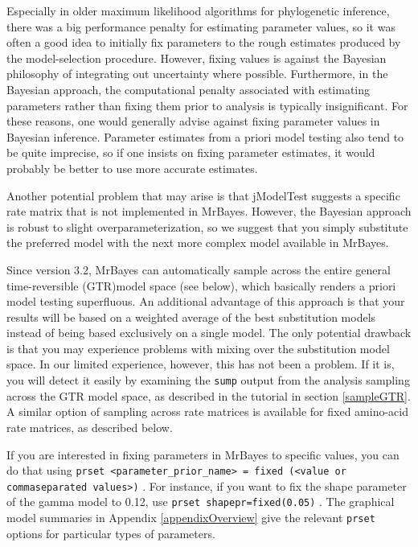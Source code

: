 \documentclass[12pt]{book}
\newcommand{\ttt}[1]{\texttt{#1} }
\begin{document}
Especially in older maximum likelihood algorithms for phylogenetic inference, there was a big
performance penalty for estimating parameter values, so it was often a good idea to initially fix
parameters to the rough estimates produced by the model-selection procedure. However, fixing values
is against the Bayesian philosophy of integrating out uncertainty where possible. Furthermore, in the Bayesian approach, the computational penalty associated with estimating parameters rather than fixing them prior
to analysis is typically insignificant. For these reasons, one would generally advise against fixing parameter
values in Bayesian inference. Parameter estimates from a priori model testing also tend to be quite imprecise,
so if one insists on fixing parameter estimates, it would probably be better to use more accurate estimates.

Another potential problem that may arise is that jModelTest suggests a specific rate matrix that
is not implemented in MrBayes. However, the Bayesian approach is robust to slight
overparameterization, so we suggest that you simply substitute the preferred model with the
next more complex model available in MrBayes.

Since version 3.2, MrBayes can automatically sample across the entire general time-reversible (GTR)model
space (see below), which basically renders a priori model testing superfluous. An additional
advantage of this approach is that your results will be based on a weighted average of the
best substitution models instead of being based exclusively on a single model. The only potential
drawback is that you may experience problems with mixing over the substitution model space.
In our limited experience, however, this has not been a problem. If it is, you will detect it
easily by examining the \ttt{sump} output from the analysis sampling across the GTR model space,
as described in the tutorial in section \ref{sampleGTR}.
A similar option of sampling across rate matrices is available for fixed amino-acid rate matrices,
as described below.

If you are interested in fixing parameters in MrBayes to specific values, you can do that using
\ttt{prset <parameter\_prior\_name> = fixed (<value or commaseparated
values>)}. For instance, if you want to fix the shape parameter of the
gamma model to 0.12, use \ttt{prset shapepr=fixed(0.05)}. The graphical model summaries in
Appendix \ref{appendixOverview} give the relevant \ttt{prset} options for particular types of parameters.
\end{document}
